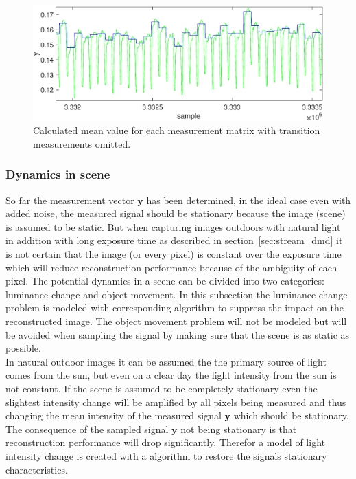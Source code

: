 \begin{figure}[H]
\includegraphics[width = 1\linewidth]{gfx/signal_proc/isolated_final_signal.eps}
\caption{Calculated mean value for each measurement matrix with transition measurements omitted.}
	\label{fig:detarmain_signal}
\end{figure}



\subsubsection{Dynamics in scene} %
\label{sec:Dynamics_in_scene}
So far the measurement vector $\mathbf{y}$ has been determined, in the ideal case even with added noise, the measured signal should be stationary because the image (scene) is assumed to be static. But when capturing images outdoors with natural light in addition with long exposure time as described in section~\ref{sec:stream_dmd} it is not certain that the image (or every pixel) is constant over the exposure time which will reduce reconstruction performance because of the ambiguity of each pixel. The potential dynamics in a scene can be divided into two categories: luminance change and object movement. In this subsection the luminance change problem is modeled with corresponding algorithm to suppress the impact on the reconstructed image. The object movement problem will not be modeled but will be avoided when sampling the signal by making sure that the scene is as static as possible.\\[0.1in] 


In natural outdoor images it can be assumed the the primary source of light comes from the sun, but even on a clear day the light intensity from the sun is not constant. If the scene is assumed to be completely stationary even the slightest intensity change will be amplified by all pixels being measured and thus changing the mean intensity of the measured signal $\mathbf{y}$ which should be stationary. The consequence of the sampled signal $\mathbf{y}$ not being stationary is that reconstruction performance will drop significantly. Therefor a model of light intensity change is created with a algorithm to restore the signals stationary characteristics.\\[0.1in] 


